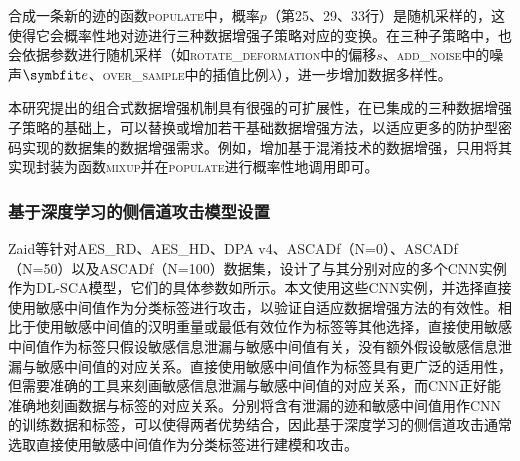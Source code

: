 {	合成一条新的迹的函数\textsc{populate}中，概率$p$（第25、29、33行）是随机采样的，这使得它会概率性地对迹进行三种数据增强子策略对应的变换。在三种子策略中，也会依据参数进行随机采样（如\textsc{rotate\_deformation}中的偏移$s$、\textsc{add\_noise}中的噪声$\Vector e$、\textsc{over\_sample}中的插值比例$\lambda$），进一步增加数据多样性。
	
	本研究提出的组合式数据增强机制具有很强的可扩展性，在已集成的三种数据增强子策略的基础上，可以替换或增加若干基础数据增强方法，以适应更多的防护型密码实现的数据集的数据增强需求。例如，增加基于混淆技术的数据增强，只用将其实现封装为函数\textsc{mixup}并在\textsc{populate}进行概率性地调用即可。
	\subsubsection{基于深度学习的侧信道攻击模型设置}
	Zaid等\citep{Zaid20}针对AES\_RD、AES\_HD、DPA v4、ASCADf（N=0）、ASCADf（N=50）以及ASCADf（N=100）数据集，设计了与其分别对应的多个CNN实例作为DL-SCA模型，它们的具体参数如所示。本文使用这些CNN实例，并选择直接使用敏感中间值作为分类标签进行攻击，以验证自适应数据增强方法的有效性。相比于使用敏感中间值的汉明重量或最低有效位作为标签等其他选择，直接使用敏感中间值作为标签只假设敏感信息泄漏与敏感中间值有关，没有额外假设敏感信息泄漏与敏感中间值的对应关系。直接使用敏感中间值作为标签具有更广泛的适用性，但需要准确的工具来刻画敏感信息泄漏与敏感中间值的对应关系，而CNN正好能准确地刻画数据与标签的对应关系。分别将含有泄漏的迹和敏感中间值用作CNN的训练数据和标签，可以使得两者优势结合，因此基于深度学习的侧信道攻击通常选取直接使用敏感中间值作为分类标签进行建模和攻击。
	
}
